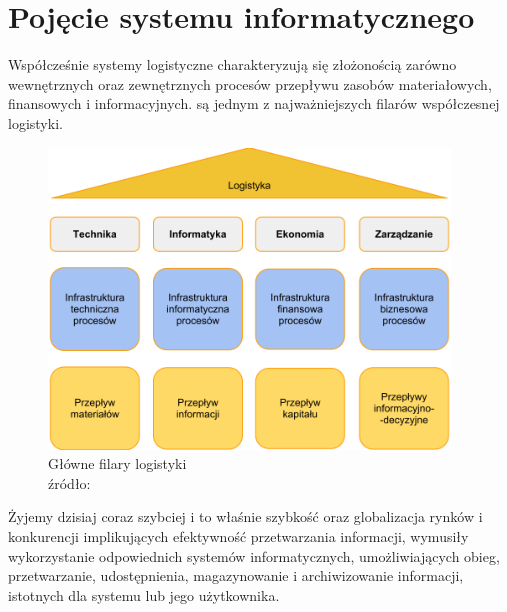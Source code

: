 \section{Pojęcie systemu informatycznego}	
	Współcześnie systemy logistyczne charakteryzują się złożonością zarówno wewnętrznych oraz zewnętrznych
	procesów przepływu zasobów materiałowych, finansowych i informacyjnych. są jednym z najważniejszych filarów
	współczesnej logistyki.
	\begin{figure}[h]
		\centering
		\includegraphics[width=0.95\textwidth]{images/filary_logistyki}
		\caption[Główne filary logistyki]{
			Główne filary logistyki\\
			źródło: \cite{logistyka_w_przedsiebiorstwie}
		}
	\end{figure}
	Żyjemy dzisiaj coraz szybciej i to właśnie szybkość oraz globalizacja rynków i konkurencji
	implikujących efektywność przetwarzania informacji, wymusiły wykorzystanie odpowiednich
	systemów informatycznych, umożliwiających obieg, przetwarzanie, udostępnienia, magazynowanie
	i archiwizowanie informacji, istotnych dla systemu lub jego użytkownika.  	
	
